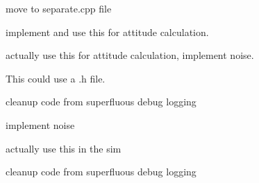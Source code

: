 
\begin{DoxyRefList}
\item[\label{todo__todo000006}%
\hypertarget{todo__todo000006}{}%
Class \hyperlink{classAsync__Server}{Async\+\_\+\+Server} ]move to separate.\+cpp file  
\item[\label{todo__todo000001}%
\hypertarget{todo__todo000001}{}%
Class \hyperlink{classAttitudeSensor}{Attitude\+Sensor} ]implement and use this for attitude calculation. 

actually use this for attitude calculation, implement noise.  
\item[\label{todo__todo000005}%
\hypertarget{todo__todo000005}{}%
Class \hyperlink{classFinkenPlugin}{Finken\+Plugin} ]This could use a .h file.  
\item[\label{todo__todo000003}%
\hypertarget{todo__todo000003}{}%
Class \hyperlink{classLogLine}{Log\+Line} ]cleanup code from superfluous debug logging  
\item[\label{todo__todo000007}%
\hypertarget{todo__todo000007}{}%
Class \hyperlink{classPositionSensor}{Position\+Sensor} ]implement noise  
\item[\label{todo__todo000008}%
\hypertarget{todo__todo000008}{}%
Class \hyperlink{classSonar}{Sonar} ]actually use this in the sim  
\item[\label{todo__todo000004}%
\hypertarget{todo__todo000004}{}%
Class \hyperlink{classVrepLog}{Vrep\+Log} ]cleanup code from superfluous debug logging 
\end{DoxyRefList}